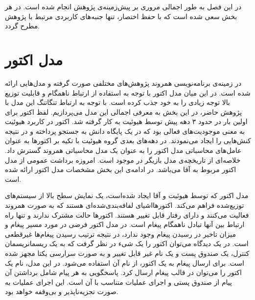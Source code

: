 در این فصل به طور اجمالی مروری بر پیش‌زمینه‌ی پژوهش انجام شده است. در هر بخش سعی شده است که با حفظ اختصار، تنها جنبه‌های  کاربردی مرتبط با پژوهش مطرح گردد.
\section{مدل اکتور}
\label{section:actorModel}

در زمینه‌ی برنامه‌نویسی همروند پژوهش‌های مختلفی صورت گرفته و مدل‌هایی ارائه شده است\cite{Briot98concurrencyand}. در این میان مدل \gls{اکتور} با توجه به استفاده از ارتباط ناهمگام و قابلیت توزیع بالا توجه زیادی را به خود جذب کرده است. با توجه به ارتباط تنگاتنگ این مدل با پژوهش حاضر، در این بخش به معرفی اجمالی این مدل می‌پردازیم.
لفظ اکتور برای اولین بار در حدود ۳ دهه پیش توسط هیوئیت  \cite{Hewitt1972} به کار گرفته شد. اکتور در کاربرد هیوئیت به معنی موجودیت‌های فعالی بود که در یک پایگاه دانش به جستجو پرداخته و در نتیجه کنش‌هایی را ایجاد می‌نمودند. در دهه‌های بعدی گروه هیوئیت با تکیه بر اکتورها به عنوان عامل‌های محاسباتی مدل اکتور را به عنوان یک مدل محاسباتی همروند گسترش داد. خلاصه‌ای از تاریخچه‌ی مدل بازیگر در \cite{AghaMST97} موجود است. امروزه برداشت عمومی از مدل اکتور مربوط به  آقا\cite{Agha_86} می‌باشد. در ادامه‌ی این بخش مشخصات مدل اکتور ارائه شده است.
 
مدل اکتور که توسط هیوئیت و آقا \cite{Hewitt1972,Agha1987,Agha1990} ایجاد شده‌است، یک نمایش سطح بالا از سیستم‌های توزیع‌شده فراهم می‌کند. 
\gls{اکتور}هااشیای \gls{لفافه‌بندی‌شده}‌ای هستند که به صورت \gls{همروند} فعالیت می‌کنند و دارای \gls{رفتار} قابل تغییر هستند. 
اکتورها \gls{حالت  مشترک} ندارند و تنها راه ارتباط بین آنها تبادل ناهمگام پیغام است. 
 در مدل اکتور فرضی در مورد مسیر پیغام و میزان تاخیر در رسیدن پیغام وجود ندارد، در نتیجه ترتیب رسیدن پیغام‌ها \gls{غیرقطعی} است.
 در یک دیدگاه می‌توان اکتور را یک \gls{شی‌ء} در نظر گرفت که به یک ریسمان\gls{ریسمان} کنترل، یک صندوق پست و یک نام غیر قابل تغییر و به صورت سرارسی یکتا  مجهز شده است. برای ارسال پیغام به یک اکتور، از نام آن استفاده می‌شود. در این مدل، نام  یک اکتور را می‌توان در قالب پیغام  ارسال کرد. پاسخگویی به هر پیام شامل برداشتن آن پیام از صندوق پستی و اجرای عملیات متناسب با آن است.
این اجرای عملیات به صورت \gls{تجزیه‌ناپذیر} و بی‌وقفه خواهد بود\cite{Agha_86}.


